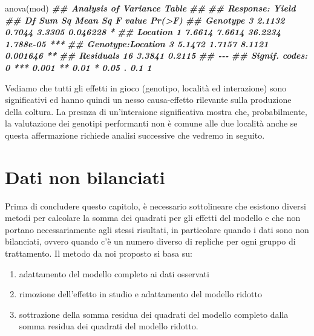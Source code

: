 \documentclass[
  12pt,
]{book}
\newenvironment{Shaded}{\begin{snugshade}}{\end{snugshade}}
\newcommand{\DocumentationTok}[1]{\textcolor[rgb]{0.56,0.35,0.01}{\textbf{\textit{#1}}}}
\newcommand{\FunctionTok}[1]{\textcolor[rgb]{0.00,0.00,0.00}{#1}}
\newcommand{\NormalTok}[1]{#1}
\providecommand{\tightlist}{%
  \setlength{\itemsep}{0pt}\setlength{\parskip}{0pt}}
\begin{document}
\begin{Shaded}
\begin{Highlighting}[]
\FunctionTok{anova}\NormalTok{(mod)}
\DocumentationTok{\#\# Analysis of Variance Table}
\DocumentationTok{\#\# }
\DocumentationTok{\#\# Response: Yield}
\DocumentationTok{\#\#                   Df Sum Sq Mean Sq F value    Pr(\textgreater{}F)    }
\DocumentationTok{\#\# Genotype           3 2.1132  0.7044  3.3305  0.046228 *  }
\DocumentationTok{\#\# Location           1 7.6614  7.6614 36.2234 1.788e{-}05 ***}
\DocumentationTok{\#\# Genotype:Location  3 5.1472  1.7157  8.1121  0.001646 ** }
\DocumentationTok{\#\# Residuals         16 3.3841  0.2115                      }
\DocumentationTok{\#\# {-}{-}{-}}
\DocumentationTok{\#\# Signif. codes:  0 \textquotesingle{}***\textquotesingle{} 0.001 \textquotesingle{}**\textquotesingle{} 0.01 \textquotesingle{}*\textquotesingle{} 0.05 \textquotesingle{}.\textquotesingle{} 0.1 \textquotesingle{} \textquotesingle{} 1}
\end{Highlighting}
\end{Shaded}

Vediamo che tutti gli effetti in gioco (genotipo, località ed interazione) sono significativi ed hanno quindi un nesso causa-effetto rilevante sulla produzione della coltura. La presnza di un'interaione significativa mostra che, probabilmente, la valutazione dei genotipi performanti non è comune alle due località anche se questa affermazione richiede analisi successive che vedremo in seguito.

\hypertarget{dati-non-bilanciati}{%
\section{Dati non bilanciati}\label{dati-non-bilanciati}}

Prima di concludere questo capitolo, è necessario sottolineare che esistono diversi metodi per calcolare la somma dei quadrati per gli effetti del modello e che non portano necessariamente agli stessi risultati, in particolare quando i dati sono non bilanciati, ovvero quando c'è un numero diverso di repliche per ogni gruppo di trattamento. Il metodo da noi proposto si basa su:

\begin{enumerate}
\def\labelenumi{\arabic{enumi}.}
\tightlist
\item
  adattamento del modello completo ai dati osservati
\item
  rimozione dell'effetto in studio e adattamento del modello ridotto
\item
  sottrazione della somma residua dei quadrati del modello completo dalla somma residua dei quadrati del modello ridotto.
\end{enumerate}
\end{document}

